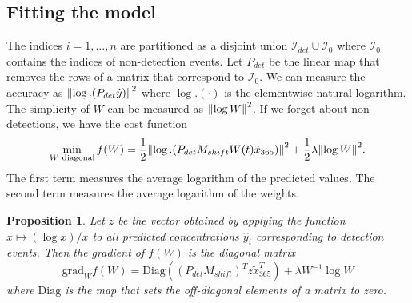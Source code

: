 \documentclass{article}
\newtheorem{proposition}{Proposition}
\begin{document}
\subsection{Fitting the model}
The indices $i = 1,\dots,n$ are partitioned as a disjoint union $\mathcal{I}_{det} \cup \mathcal{I}_{0}$ where $\mathcal{I}_0$ contains the indices of non-detection events. Let $P_{det}$ be the linear map that removes the rows of a matrix that correspond to $\mathcal{I}_0$. We can measure the accuracy as $\norm{\log.(P_{det} \hat{y})}^2$ where $\log.(\cdot)$ is the elementwise natural logarithm. The simplicity of $W$ can be measured as $\norm{\log W}^2$. If we forget about non-detections, we have the cost function 
$$
\min_{W \text{ diagonal}} f(W) =
\frac{1}{2}\norm{\log.(P_{det} M_{shift} W(t) \tilde{x}_{365})}^2 + \frac{1}{2}\lambda \norm{\log W}^2
.$$
The first term measures the average logarithm of the predicted values. The second term measures the average logarithm of the weights.
\begin{proposition}
    Let $z$ be the vector obtained by applying the function $x \mapsto (\log x) / x$ to all predicted concentrations $\hat{y}_i$ corresponding to detection events. Then the gradient of $f(W)$ is the diagonal matrix
    $$
    \mathrm{grad}_{W} f(W) = \mathrm{Diag}\left((P_{det} M_{shift})^T z \tilde{x}_{365}^T\right) + \lambda W^{-1} \log W
    $$
    where $\mathrm{Diag}$ is the map that sets the off-diagonal elements of a matrix to zero.
\end{proposition}
\end{document}
